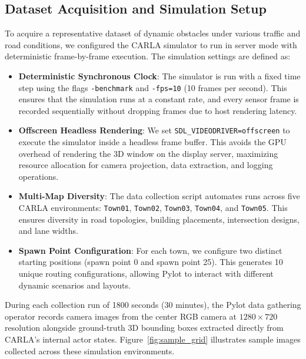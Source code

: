 \documentclass[11pt,a4paper]{report}
\begin{document}
\subsection{Dataset Acquisition and Simulation Setup}
To acquire a representative dataset of dynamic obstacles under various traffic and road conditions, we configured the CARLA simulator to run in server mode with deterministic frame-by-frame execution. The simulation settings are defined as:
\begin{itemize}
    \item \textbf{Deterministic Synchronous Clock}: The simulator is run with a fixed time step using the flags \texttt{-benchmark} and \texttt{-fps=10} (10 frames per second). This ensures that the simulation runs at a constant rate, and every sensor frame is recorded sequentially without dropping frames due to host rendering latency.
    \item \textbf{Offscreen Headless Rendering}: We set \texttt{SDL\_VIDEODRIVER=offscreen} to execute the simulator inside a headless frame buffer. This avoids the GPU overhead of rendering the 3D window on the display server, maximizing resource allocation for camera projection, data extraction, and logging operations.
    \item \textbf{Multi-Map Diversity}: The data collection script automates runs across five CARLA environments: \texttt{Town01}, \texttt{Town02}, \texttt{Town03}, \texttt{Town04}, and \texttt{Town05}. This ensures diversity in road topologies, building placements, intersection designs, and lane widths.
    \item \textbf{Spawn Point Configuration}: For each town, we configure two distinct starting positions (spawn point 0 and spawn point 25). This generates 10 unique routing configurations, allowing Pylot to interact with different dynamic scenarios and layouts.
\end{itemize}

During each collection run of 1800 seconds (30 minutes), the Pylot data gathering operator records camera images from the center RGB camera at $1280 \times 720$ resolution alongside ground-truth 3D bounding boxes extracted directly from CARLA's internal actor states. Figure~\ref{fig:sample_grid} illustrates sample images collected across these simulation environments.
\end{document}
